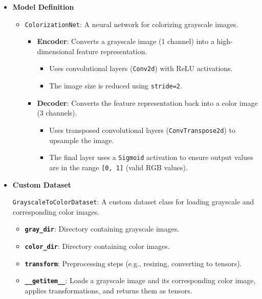 \documentclass[conference]{IEEEtran}
\begin{document}
\begin{itemize}
    \item \textbf{Model Definition}
    \begin{itemize}
        \item \texttt{ColorizationNet}: A neural network for colorizing grayscale images.
        \begin{itemize}
            \item \textbf{Encoder}: Converts a grayscale image (1 channel) into a high-dimensional feature representation.
            \begin{itemize}
                \item Uses convolutional layers (\verb|Conv2d|) with ReLU activations.
                \item The image size is reduced using \verb|stride=2|.
            \end{itemize}
            \item \textbf{Decoder}: Converts the feature representation back into a color image (3 channels).
            \begin{itemize}
                \item Uses transposed convolutional layers (\verb|ConvTranspose2d|) to upsample the image.
                \item The final layer uses a \verb|Sigmoid| activation to ensure output values are in the range \verb|[0, 1]| (valid RGB values).
            \end{itemize}
        \end{itemize}
    \end{itemize}

    \item \textbf{Custom Dataset}
    
    \texttt{GrayscaleToColorDataset}: A custom dataset class for loading grayscale and corresponding color images.
    
\begin{itemize}
    \item \textbf{\lstinline|gray_dir|}: Directory containing grayscale images.
    \item \textbf{\lstinline|color_dir|}: Directory containing color images.
    \item \textbf{\lstinline|transform|}: Preprocessing steps (e.g., resizing, converting to tensors).
    \item \textbf{\lstinline|__getitem__|}: Loads a grayscale image and its corresponding color image, applies transformations, and returns them as tensors.
\end{itemize}


\end{itemize}
\end{document}
